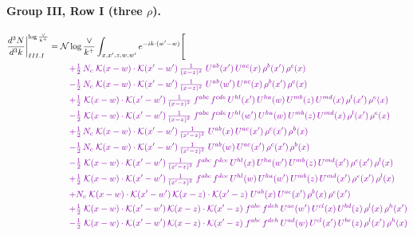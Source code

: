 \documentclass[10pt]{article}
\numberwithin{equation}{section}
\newcommand{\NNv}{\mathcal N\log\frac{\vee}{k^+}}
\begin{document}
\paragraph{Group III, Row I (three $\rho$).}
\begin{align}
\frac{d^3N}{d^3k}\bigg|^{\log\frac{\vee}{k^+}}_{III.I}={}&\NNv\int_{x,x',z,w,w'}e^{-ik\cdot(w'-w)}\Bigg[\notag\\
&\quad{\color{CC}+\tfrac{1}{2}\,N_c\;\mathcal{K}(x-w)\cdot\mathcal{K}(x'-w')\,\tfrac{1}{(x-z)^{2}}\;U^{ab}(x')\,U^{ac}(x)\,\rho^{b}(x')\,\rho^{c}(x)}\notag\\
&\quad{\color{CC}-\tfrac{1}{2}\,N_c\;\mathcal{K}(x-w)\cdot\mathcal{K}(x'-w')\,\tfrac{1}{(x-z)^{2}}\;U^{ab}(w')\,U^{ac}(x)\,\rho^{b}(x')\,\rho^{c}(x)}\notag\\
&\quad{\color{CC}+\tfrac{1}{2}\;\mathcal{K}(x-w)\cdot\mathcal{K}(x'-w')\,\tfrac{1}{(x-z)^{2}}\;f^{abc}\,f^{cde}\,U^{hl}(x')\,U^{ha}(w)\,U^{mb}(z)\,U^{md}(x)\,\rho^{l}(x')\,\rho^{e}(x)}\notag\\
&\quad{\color{CC}-\tfrac{1}{2}\;\mathcal{K}(x-w)\cdot\mathcal{K}(x'-w')\,\tfrac{1}{(x-z)^{2}}\;f^{abc}\,f^{cde}\,U^{hl}(w')\,U^{ha}(w)\,U^{mb}(z)\,U^{md}(x)\,\rho^{l}(x')\,\rho^{e}(x)}\notag\\
&\quad{\color{CC}+\tfrac{1}{2}\,N_c\;\mathcal{K}(x-w)\cdot\mathcal{K}(x'-w')\,\tfrac{1}{(x'-z)^{2}}\;U^{ab}(x)\,U^{ac}(x')\,\rho^{c}(x')\,\rho^{b}(x)}\notag\\
&\quad{\color{CC}-\tfrac{1}{2}\,N_c\;\mathcal{K}(x-w)\cdot\mathcal{K}(x'-w')\,\tfrac{1}{(x'-z)^{2}}\;U^{ab}(w)\,U^{ac}(x')\,\rho^{c}(x')\,\rho^{b}(x)}\notag\\
&\quad{\color{CC}-\tfrac{1}{2}\;\mathcal{K}(x-w)\cdot\mathcal{K}(x'-w')\,\tfrac{1}{(x'-z)^{2}}\;f^{abc}\,f^{dce}\,U^{hl}(x)\,U^{ha}(w')\,U^{mb}(z)\,U^{md}(x')\,\rho^{e}(x')\,\rho^{l}(x)}\notag\\
&\quad{\color{CC}+\tfrac{1}{2}\;\mathcal{K}(x-w)\cdot\mathcal{K}(x'-w')\,\tfrac{1}{(x'-z)^{2}}\;f^{abc}\,f^{dce}\,U^{hl}(w)\,U^{ha}(w')\,U^{mb}(z)\,U^{md}(x')\,\rho^{e}(x')\,\rho^{l}(x)}\notag\\
&\quad{\color{CC}+N_c\;\mathcal{K}(x-w)\cdot\mathcal{K}(x'-w')\,\mathcal{K}(x-z)\cdot\mathcal{K}(x'-z)\;U^{ab}(x)\,U^{ac}(x')\,\rho^{b}(x)\,\rho^{c}(x')}\notag\\
&\quad{\color{CC}+\tfrac{1}{2}\;\mathcal{K}(x-w)\cdot\mathcal{K}(x'-w')\,\mathcal{K}(x-z)\cdot\mathcal{K}(x'-z)\;f^{abc}\,f^{deh}\,U^{ae}(w')\,U^{cl}(x)\,U^{bd}(z)\,\rho^{l}(x)\,\rho^{h}(x')}\notag\\
&\quad{\color{CC}-\tfrac{1}{2}\;\mathcal{K}(x-w)\cdot\mathcal{K}(x'-w')\,\mathcal{K}(x-z)\cdot\mathcal{K}(x'-z)\;f^{abc}\,f^{deh}\,U^{ad}(w)\,U^{cl}(x')\,U^{be}(z)\,\rho^{l}(x')\,\rho^{h}(x)}\notag\\

\end{align}
\end{document}
